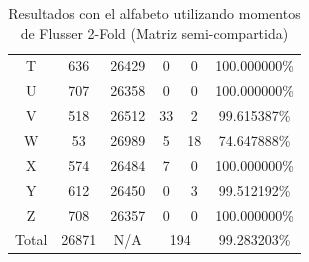 \documentclass[a4paper, 11pt, oneside]{report}
\begin{document}
\begin{table}
\begin{tabular}{|c|c|c|c|c|c|}
	T & 636 & 26429 & 0 & 0 & 100.000000\% \\ 
	U & 707 & 26358 & 0 & 0 & 100.000000\% \\ 
	V & 518 & 26512 & 33 & 2 & 99.615387\% \\ 
	W & 53 & 26989 & 5 & 18 & 74.647888\% \\ 
	X & 574 & 26484 & 7 & 0 & 100.000000\% \\ 
	Y & 612 & 26450 & 0 & 3 & 99.512192\% \\ 
	Z & 708 & 26357 & 0 & 0 & 100.000000\% \\ 
	\hline
	Total & 26871 & N/A & \multicolumn{2}{|c|}{194} & 99.283203\% \\
	\hline
\end{tabular}
\caption{Resultados con el alfabeto utilizando momentos de Flusser 2-Fold (Matriz semi-compartida)}
\label{tb:alphaRotShared}
\end{table}
\end{document}
